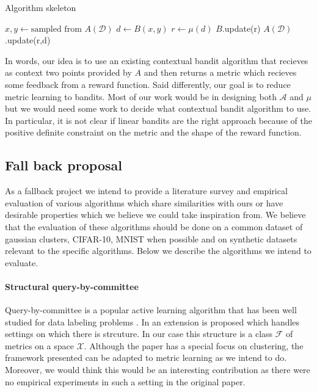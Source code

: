 \documentclass{article}
\begin{document}
\begin{algorithm}
\caption{Algorithm skeleton}\label{alg:cap}
\begin{algorithmic}
    \State $x, y \gets \text{sampled from } A(\mathcal{D})$
    \State $d \gets B(x,y)$
    \State $r \gets \mu(d)$
    \State $B$.update(r)
    \State $A(\mathcal{D})$.update(r,d)
  \EndWhile 
\end{algorithmic}
\end{algorithm}
In words, our idea is to use an existing contextual bandit algorithm that recieves as context two points provided by $A$ and then returns a metric which recieves some feedback from a 
reward function. 
Said differently, our goal is to reduce metric learning to bandits. 
Most of our work would be in designing both $\mathcal{A}$ and $\mu$ but we would need some work to decide what contextual bandit algorithm to use.
In particular,  it is not clear if linear bandits are the right approach because of the positive definite constraint on the metric and the 
shape of the reward function. 

\subsection{Fall back proposal}
\label{fallback-prop}
As a fallback project we intend to provide a literature survey and empirical evaluation of various algorithms which share similarities with ours or have desirable properties which we believe
we could take inspiration from. We believe that the evaluation of these algorithms should be done on a common dataset of gaussian clusters, CIFAR-10, MNIST when possible and on synthetic datasets relevant to the specific algorithms.
Below we describe the algorithms we intend to evaluate. 

\paragraph{Structural query-by-committee} 
Query-by-committee  is a popular active learning algorithm that has been well studied for data labeling problems \cite{QBC}.
In \cite{SQBC} an extension is proposed which handles settings on which there is strcuture. 
In our case this structure is a class $\mathcal{F}$ of metrics on a space $\mathcal{X}$. 
Although the paper has a special focus on clustering, the framework presented can be adapted to metric learning as we intend to do. 
Moreover, we would think this would be an interesting contribution as there were no empirical experiments in such a setting in the original paper.
\end{document}
